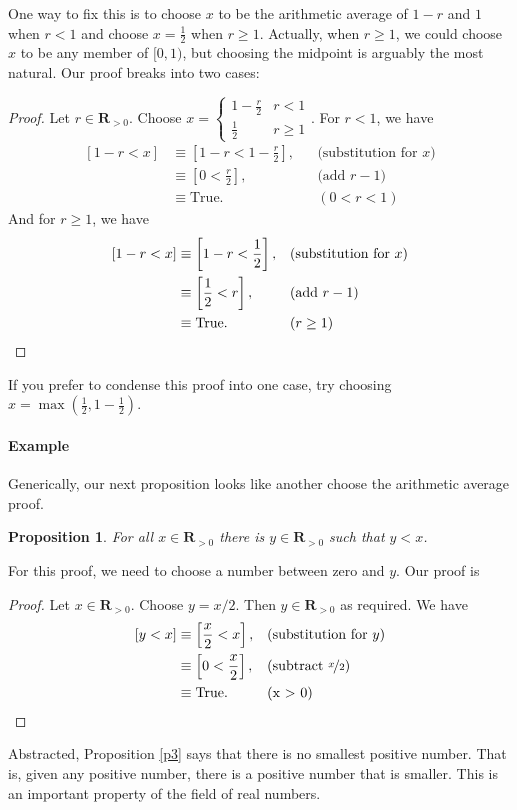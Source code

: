 \documentclass[12pt,fleqn]{article}
\newcommand{\reals}{\mathbf{R}}
\newcommand{\true}{\mathrm{True}}
\newenvironment{myproof}
  {\begin{shaded}\begin{proof}}
  {\end{proof}\end{shaded}}
\newtheorem{prop}{Proposition}
\newcounter{ex}\setcounter{ex}{0}
\newcommand{\ex}{%
\setcounter{ex}{\value{ex}+1}
\paragraph{Example \theex}}
\begin{document}
One way to fix this is to choose $x$ to be the arithmetic average of $1-r$ and $1$ when $r < 1$ and choose $x = \frac{1}{2}$ when $r \geq 1$. 
Actually, when $r \geq 1$, we could choose $x$ to be any member of $[0,1)$, but choosing the midpoint is arguably the most natural.
Our proof breaks into two cases:
     
      \begin{myproof} Let $r \in \reals_{>0}$. Choose $x = \begin{cases} 1 - \frac{r}{2}  & r < 1 \\ \frac{1}{2} & r \geq 1 \end{cases}$. For $r < 1$, we have
      \begin{align*}
       \left[1-r < x \right] &\equiv \left[1-r < 1 - \frac{r}{2}  \right], && \text{(substitution for $x$)} \\
                                  &\equiv  \left[0 <  \frac{r}{2}  \right], && \text{(add $r-1$)} \\
                                  &\equiv \true.   &&(0 < r < 1)
      \end{align*}
      And for $r \geq 1$, we have
       \begin{align*}
       \left[1-r < x \right] &\equiv \left[1-r < \frac{1}{2}  \right], && \text{(substitution for $x$)} \\
                                  &\equiv  \left[\frac{1}{2}  <  r  \right], && \text{(add $r-1$)} \\
                                  &\equiv \true.   &&(r \geq 1) \qedhere
      \end{align*}
      \end{myproof}
 If you prefer to condense this proof into one case, try choosing $x = \max(\frac{1}{2}, 1-\frac{1}{2})$.

 \ex   Generically, our next proposition looks like another choose 
 the arithmetic average proof. 
      
    \begin{prop}   For all $x \in \reals_{>0}$ there is 
      $y \in \reals_{> 0}$ such that $y < x$.  \label{p5}
    \end{prop}
   
    For this proof,  we need to choose a  number between  zero and $y$. Our proof is
      \begin{myproof}  Let $x \in \reals_{>0}$. Choose $y = x/2$. Then $y \in \reals_{>0}$ as required. We have
         \begin{align*}
         \left[y < x \right] &\equiv \left[\frac{x}{2} < x \right], &&\text{(substitution for $y$)} \\
                                   &\equiv \left[0 < \frac{x}{2}  \right], &&\text{(subtract $\nicefrac{x}{2}$)} \\
                                   &\equiv \true.  &&\text{(x > 0)} \qedhere
      \end{align*}
      \end{myproof}
Abstracted, Proposition \ref{p3} says that there is no smallest positive number. That is, given any positive number, there is a 
positive number that is smaller.  This is an important property of the field of real numbers.
       
\end{document}
